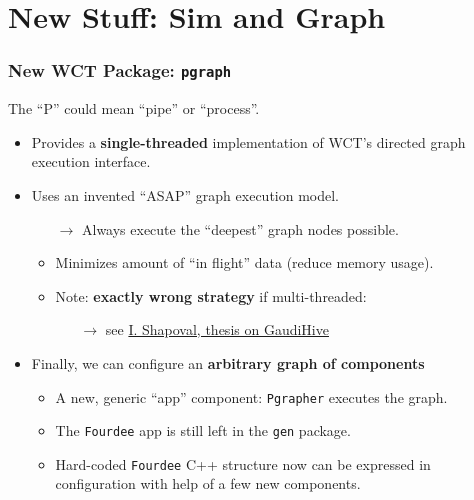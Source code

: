 \documentclass[xcolor=dvipsnames]{beamer}
\begin{document}




\section{New Stuff: Sim and Graph}
\begin{frame}
\end{frame}

\begin{frame}
  \frametitle{New WCT Package: \texttt{pgraph}}
  The ``P'' could mean ``pipe'' or ``process''.
  \begin{itemize}\footnotesize
  \item Provides a \textbf{single-threaded} implementation of WCT's
    directed graph execution interface.
  \item Uses an invented ``ASAP'' graph execution model.
    \begin{itemize}\scriptsize
    \item[$\to$] Always execute the ``deepest'' graph nodes possible.
    \item Minimizes amount of ``in flight'' data (reduce memory usage).
    \item Note: \textbf{exactly wrong strategy} if multi-threaded:
      \begin{itemize}\scriptsize
      \item[$\to$] see \href{http://inspirehep.net/record/1503877}{I. Shapoval, thesis on GaudiHive}
      \end{itemize}
    \end{itemize}
  \item Finally, we can configure an \textbf{arbitrary graph of
      components}
    \begin{itemize}\scriptsize
    \item A new, generic ``app'' component: \texttt{Pgrapher} executes the graph.
    \item The \texttt{Fourdee} app is still left in the \texttt{gen} package.
    \item Hard-coded \texttt{Fourdee} C++ structure now can be
      expressed in configuration with help of a few new components.
    \end{itemize}
  \end{itemize}
\end{frame}
\end{document}
